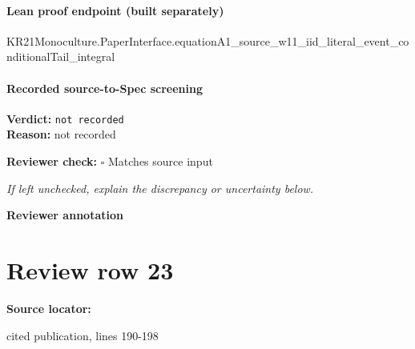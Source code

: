 \documentclass[10pt]{article}
\newcommand{\reviewerbox}{%
  \par\noindent\fbox{\parbox{0.96\linewidth}{\rule{0pt}{0.38in}}}\par
}
\newcommand{\reviewmatch}[1]{%
  \par\noindent\textbf{Reviewer check:} $\square$\; #1\par
  \noindent\emph{If left unchecked, explain the discrepancy or uncertainty below.}\par
}
\begin{document}
\paragraph{Lean proof endpoint (built separately)}\begin{ReviewVerbatim}
KR21Monoculture.PaperInterface.equationA1_source_w11_iid_literal_event_conditionalTail_integral
\end{ReviewVerbatim}

\paragraph{Recorded source-to-Spec screening}
\textbf{Verdict:} \texttt{not recorded}
\\
\textbf{Reason:} not recorded
\reviewmatch{Matches source input}
\noindent\textbf{Reviewer annotation}\par
\reviewerbox
\clearpage
\hypertarget{source-claim-aa9b8f734e8009d3}{}
\section*{Review row 23}
\textbf{Source locator:} {\footnotesize\raggedright cited publication, lines 190-\allowbreak{}198\par}
\end{document}
